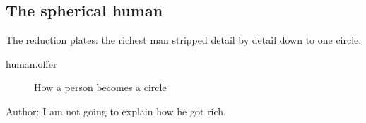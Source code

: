 
\subsection{The spherical human}\label{act:human}

\label{human}

The reduction plates: the richest man stripped detail by detail down to one
circle.


\begin{description}
  \item[human.offer] How a person becomes a circle
\end{description}

Author: I am not going to explain how he got rich.


